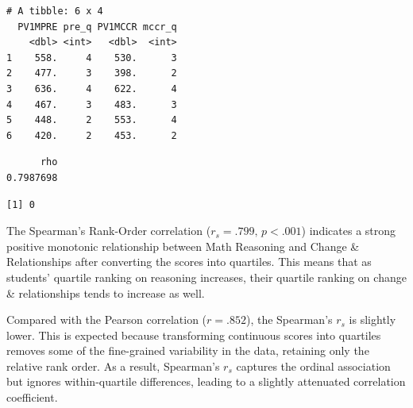 \documentclass[
  letterpaper,
  DIV=11,
  numbers=noendperiod]{scrreprt}
\newenvironment{Shaded}{\begin{snugshade}}{\end{snugshade}}
\newcommand{\AttributeTok}[1]{\textcolor[rgb]{0.40,0.45,0.13}{#1}}
\newcommand{\CommentTok}[1]{\textcolor[rgb]{0.37,0.37,0.37}{#1}}
\newcommand{\ConstantTok}[1]{\textcolor[rgb]{0.56,0.35,0.01}{#1}}
\newcommand{\FunctionTok}[1]{\textcolor[rgb]{0.28,0.35,0.67}{#1}}
\newcommand{\NormalTok}[1]{\textcolor[rgb]{0.00,0.23,0.31}{#1}}
\newcommand{\OtherTok}[1]{\textcolor[rgb]{0.00,0.23,0.31}{#1}}
\newcommand{\SpecialCharTok}[1]{\textcolor[rgb]{0.37,0.37,0.37}{#1}}
\newcommand{\StringTok}[1]{\textcolor[rgb]{0.13,0.47,0.30}{#1}}
\begin{document}
\begin{verbatim}
# A tibble: 6 x 4
  PV1MPRE pre_q PV1MCCR mccr_q
    <dbl> <int>   <dbl>  <int>
1    558.     4    530.      3
2    477.     3    398.      2
3    636.     4    622.      4
4    467.     3    483.      3
5    448.     2    553.      4
6    420.     2    453.      2
\end{verbatim}

\begin{Shaded}
\end{Shaded}

\begin{verbatim}
      rho 
0.7987698 
\end{verbatim}

\begin{Shaded}
\end{Shaded}

\begin{verbatim}
[1] 0
\end{verbatim}

The Spearman's Rank-Order correlation (\(r_s = .799, \, p < .001\))
indicates a strong positive monotonic relationship between Math
Reasoning and Change \& Relationships after converting the scores into
quartiles. This means that as students' quartile ranking on reasoning
increases, their quartile ranking on change \& relationships tends to
increase as well.

Compared with the Pearson correlation (\(r=.852\)), the Spearman's
\(r_s\) is slightly lower. This is expected because transforming
continuous scores into quartiles removes some of the fine-grained
variability in the data, retaining only the relative rank order. As a
result, Spearman's \(r_s\) captures the ordinal association but ignores
within-quartile differences, leading to a slightly attenuated
correlation coefficient.
\end{document}
